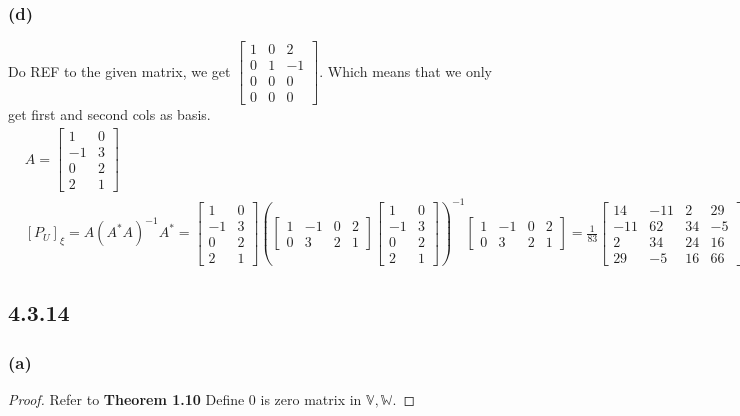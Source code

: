 \documentclass{article}
\newtheorem*{proof}{Proof}
\begin{document}
\subsubsection*{(d)}
Do REF to the given matrix, we get $\begin{bmatrix}
    1 & 0 & 2 \\
    0 & 1 & -1 \\
    0 & 0 & 0 \\
    0 & 0 & 0 
\end{bmatrix}$. Which means that we only get first and second cols as basis.
\begin{equation*}
    \begin{split}
        &A = \begin{bmatrix}
            1 & 0 \\
            -1 & 3 \\
            0 & 2 \\
            2 & 1
        \end{bmatrix}\\
        &[P_U]_\xi = A(A^*A)^{-1}A^* = \begin{bmatrix}
            1 & 0 \\
            -1 & 3 \\
            0 & 2 \\
            2 & 1
        \end{bmatrix} (\begin{bmatrix}
            1 & -1 & 0 & 2 \\
            0 & 3 & 2 & 1 
        \end{bmatrix} \begin{bmatrix}
            1 & 0 \\
            -1 & 3 \\
            0 & 2 \\
            2 & 1
        \end{bmatrix})^{-1} \begin{bmatrix}
            1 & -1 & 0 & 2 \\
            0 & 3 & 2 & 1  
        \end{bmatrix} = \frac{1}{83}\begin{bmatrix}
                14 & -11 & 2 & 29 \\
                -11 & 62 & 34 & -5 \\
                2 & 34 & 24 & 16 \\
                29 & -5 & 16 & 66
        \end{bmatrix} 
    \end{split}
\end{equation*}

\subsection*{4.3.14}
\subsubsection*{(a)}
\begin{proof}
    Refer to \textbf{Theorem 1.10}
    Define $0$ is zero matrix in $\mathbb{V, W}$. 




\end{proof}
\end{document}
